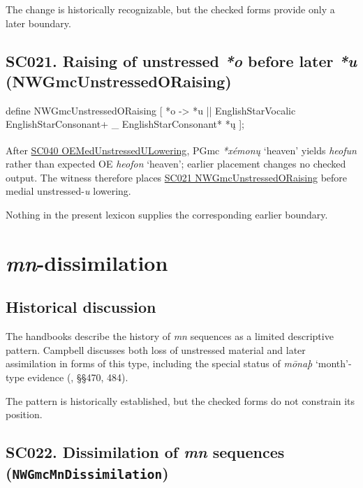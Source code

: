 \documentclass[
  british,
  a4paper,
  openany]{book}
\providecommand{\Pred}[1]{\textsuperscript{\dag}\emph{#1}}
\providecommand{\Recon}[1]{\emph{*#1}}
{\catcode`→=\active \global\def→{\ensuremath{\rightarrow}}}
\providecommand{\texorpdfstring}[2]{#1}
\DeclareRobustCommand{\CAPRRuleHeading}[2]{%
  #1\texorpdfstring{\\(#2)}{ (#2)}%
}
\providecommand{\Pred}[1]{\textsuperscript{\dag}\emph{#1}}
\providecommand{\Recon}[1]{\emph{*#1}}
{\catcode`→=\active \global\def→{\ensuremath{\rightarrow}}}
\begin{document}
The change is historically recognizable, but the checked forms provide
only a later boundary.

\subsection{\texorpdfstring{\CAPRRuleHeading{SC021. Raising of unstressed \emph{*o} before later \emph{*u}}{NWGmcUnstressedORaising}}{}}\label{rule-NWGmcUnstressedORaising}

\begin{ReaderFacingFoma}
define NWGmcUnstressedORaising [
    {*o} -> {*u} || EnglishStarVocalic EnglishStarConsonant+ _ EnglishStarConsonant* {*ų}
];
\end{ReaderFacingFoma}

After \hyperref[rule-OEMedUnstressedULowering]{SC040
OEMedUnstressedULowering}, PGmc \Recon{xémonų} `heaven' yields
\Pred{heofun} rather than expected OE \emph{heofon} `heaven'; earlier
placement changes no checked output. The witness therefore places
\hyperref[rule-NWGmcUnstressedORaising]{SC021 NWGmcUnstressedORaising}
before medial unstressed-\emph{u} lowering.

Nothing in the present lexicon supplies the corresponding earlier
boundary.

\newpage

\section{\texorpdfstring{\emph{mn}-dissimilation}{-dissimilation}}\label{dissimilation}

\subsection{Historical discussion}\label{historical-discussion-15}

The handbooks describe the history of \emph{mn} sequences as a limited
descriptive pattern. Campbell discusses both loss of unstressed material
and later assimilation in forms of this type, including the special
status of \emph{mōnaþ} `month'-type evidence
(, §§470, 484).

The pattern is historically established, but the checked forms do not
constrain its position.

\subsection{\texorpdfstring{SC022. Dissimilation of \emph{mn} sequences
(\texttt{NWGmcMnDissimilation})}{SC022. Dissimilation of  sequences (NWGmcMnDissimilation)}}\label{rule-NWGmcMnDissimilation}
\end{document}
